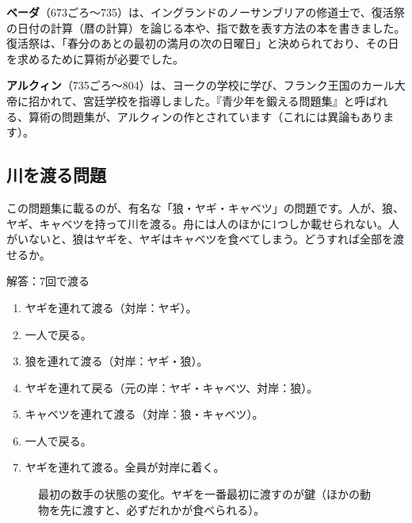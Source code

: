 \documentclass[a4paper,11pt,openany]{ltjsbook}
\begin{document}
\textbf{ベーダ}（673ごろ〜735）は、イングランドのノーサンブリアの修道士で、復活祭の日付の計算（暦の計算）を論じる本や、指で数を表す方法の本を書きました。復活祭は、「春分のあとの最初の満月の次の日曜日」と決められており、その日を求めるために算術が必要でした。

\textbf{アルクィン}（735ごろ〜804）は、ヨークの学校に学び、フランク王国のカール大帝に招かれて、宮廷学校を指導しました。『青少年を鍛える問題集』と呼ばれる、算術の問題集が、アルクィンの作とされています（これには異論もあります）。

\subsection{川を渡る問題}

この問題集に載るのが、有名な「狼・ヤギ・キャベツ」の問題です。人が、狼、ヤギ、キャベツを持って川を渡る。舟には人のほかに1つしか載せられない。人がいないと、狼はヤギを、ヤギはキャベツを食べてしまう。どうすれば全部を渡せるか。

\begin{examplebox}{解答：7回で渡る}
\begin{enumerate}[leftmargin=*]
\item ヤギを連れて渡る（対岸：ヤギ）。
\item 一人で戻る。
\item 狼を連れて渡る（対岸：ヤギ・狼）。
\item ヤギを連れて戻る（元の岸：ヤギ・キャベツ、対岸：狼）。
\item キャベツを連れて渡る（対岸：狼・キャベツ）。
\item 一人で戻る。
\item ヤギを連れて渡る。全員が対岸に着く。
\end{enumerate}
\end{examplebox}

\begin{figure}[htbp]
\centering
{}
\caption{最初の数手の状態の変化。ヤギを一番最初に渡すのが鍵（ほかの動物を先に渡すと、必ずだれかが食べられる）。}
\end{figure}
\end{document}

